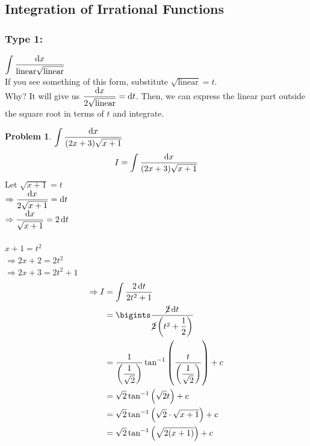 \documentclass[14]{article}
\theoremstyle{definition}
\newtheorem{prob}{Problem}
\theoremstyle{case}
\begin{document}
\subsection{Integration of Irrational Functions}
\subsubsection{Type 1:}
$\displaystyle \int \dfrac{\dif x}{\text{linear} \sqrt{\text{linear}}}$\\
If you see something of this form, substitute $\sqrt{\text{linear}} = t$.\\
Why? It will give us $\dfrac{\dif x}{2\sqrt{\text{linear}}} = \dif t$. Then, we can express the linear part outside the square root in terms of $t$ and integrate.
\begin{prob}
$\displaystyle \int \dfrac{\dif x}{(2x+3)\sqrt{x+1}}$
\[I =\int \dfrac{\dif x}{(2x+3)\sqrt{x+1}}\]
Let $\sqrt{x+1} = t$\\
$\Rightarrow \dfrac{\dif x}{2\sqrt{x+1}} = \dif t$\\
$\Rightarrow \dfrac{\dif x}{\sqrt{x+1}} = 2\dif t$\\\\
$x + 1 = t^2$\\
$\Rightarrow 2x + 2 = 2t^2$\\
$\Rightarrow 2x + 3 = 2t^2 + 1$\\
\begin{align*}
\Rightarrow I &= \int \dfrac{2\dif t}{2t^2 + 1}\\
&= \bigints \dfrac{\cancel{2} \dif t}{\cancel{2}\left( t^2 + \dfrac12 \right)}\\
&= \dfrac{1}{\left(\dfrac{1}{\sqrt2}\right)}\tan^{-1}\left(\dfrac{t}{\left(\dfrac{1}{\sqrt2}\right)}\right) + c\\
&= \sqrt2 \tan^{-1}\left(\sqrt{2} t\right) + c\\
&= \sqrt2 \tan^{-1}\left(\sqrt{2} \cdot \sqrt{x+1}\right) + c\\
&= \sqrt2 \tan^{-1}\left(\sqrt{2(x+1)}\right) + c
\end{align*}
\end{prob}
\pagebreak
\end{document}
